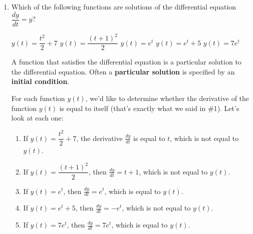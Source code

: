 \documentclass[main]{subfiles}
\begin{document}
\begin{enumerate}
\begin{enumerate}
\begin{solution}
      In words, the equation $\dfrac{dy}{dt} = y$ says, ``the
      derivative of the function $y(t)$ is equal to itself''.
    \end{solution}

  \item

    \begin{problem}
      Which of the following functions are solutions of the differential
      equation $\dfrac{dy}{dt} = y$?
      
        \begin{enumerate}[label=\protect{\maybecircle{\Alph*.}}, itemsep=0.2cm]
        \plainitem $y(t)=\dfrac{t^2}{2}+7$
        \plainitem $y(t)=\dfrac{(t+1)^2}{2}$
        \circleitem $y(t)=e^t$
        \plainitem $y(t)=e^t+5$
        \circleitem $y(t)=7e^t$
        \end{enumerate}      
            
    \end{problem}
  \begin{framed}
    A function that satisfies the differential equation is a particular solution to the differential equation. Often a \textbf{ particular solution}  is specified by an \textbf{initial condition}. \\

  \end{framed}
    \begin{solution}
      For each function $y(t)$, we'd like to determine whether the
      derivative of the function $y(t)$ is equal to itself (that's exactly what we said in
      {{\#1}}).  Let's look at each one:
      \begin{enumerate}[label=\Alph*.]
      \item If $y(t)=\dfrac{t^2}{2}+7$, the derivative $\frac{dy}{dt}$ is
        equal to $t$, which is not equal to $y(t)$.
      \item If $y(t)=\dfrac{(t+1)^2}{2}$, then $\frac{dy}{dt} = t+1$,
        which is not equal to $y(t)$.
      \item If $y(t)=e^t$, then
        $\frac{dy}{dt} = e^t$, which is equal to $y(t)$.
      \item If $y(t)=e^t+5$, then
        $\frac{dy}{dt} = -e^t$, which is not equal to $y(t)$.
      \item If $y(t)=7e^t$, then $\frac{dy}{dt} = 7e^t$, which is equal
      to $y(t)$.
      \end{enumerate}
    \end{solution}


\end{enumerate}
\end{enumerate}
\end{document}
